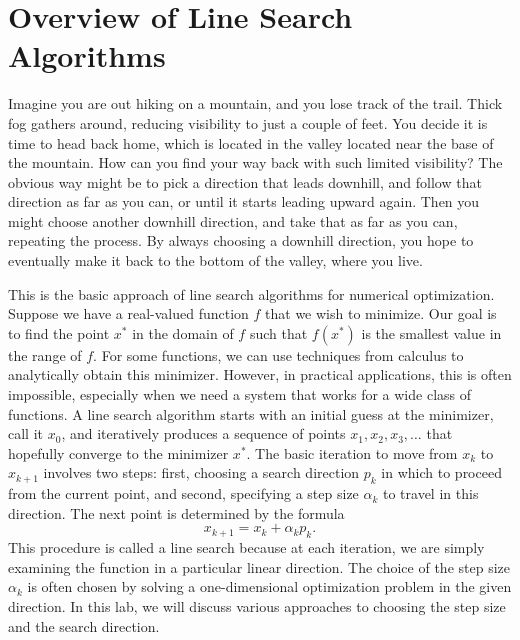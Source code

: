 
\section*{Overview of Line Search Algorithms}
Imagine you are out hiking on a mountain, and you lose track of the trail. Thick fog 
gathers around, reducing visibility to just a couple of feet. You decide it is time 
to head back home, which is located in the valley located near the base of the mountain.
How can you find your way back with such limited visibility? The obvious way might be to
pick a direction that leads downhill, and follow that direction as far as you can, or
until it starts leading upward again. Then you might choose another downhill direction,
and take that as far as you can, repeating the process. By always choosing a downhill 
direction, you hope to eventually make it back to the bottom of the valley, where you live.

This is the basic approach of line search algorithms for numerical optimization.
Suppose we have a real-valued function $f$ that we wish to minimize. Our goal is to find the
point $x^*$ in the domain of $f$ such that $f(x^*)$ is the smallest value in the range of
$f$. For some functions, we can use techniques from calculus to analytically obtain this 
minimizer. However, in practical applications, this is often impossible, especially when
we need a system that works for a wide class of functions. A line search algorithm starts with
an initial guess at the minimizer, call it $x_0$, and iteratively produces a sequence of
points $x_1, x_2, x_3, \ldots$ that hopefully converge to the minimizer $x^*$. The basic 
iteration to move from $x_k$ to $x_{k+1}$ involves two steps: first, choosing a search direction $p_k$
in which to proceed from the current point, and second, specifying a step size $\alpha_k$ to travel
in this direction. The next point is determined by the formula
$$
x_{k+1} = x_k + \alpha_kp_k.
$$
This procedure is called a line search because at each iteration, we are simply examining the
function in a particular linear direction. The choice of the step size $\alpha_k$ is often 
chosen by solving a one-dimensional optimization problem in the given direction. In this lab,
we will discuss various approaches to choosing the step size and the search direction.

